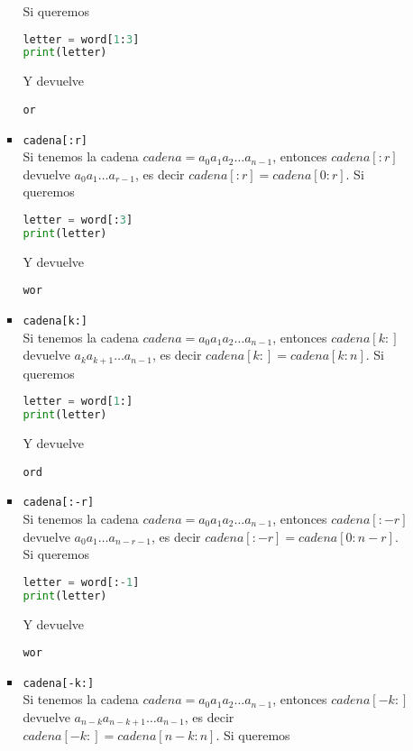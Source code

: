 \begin{enumerate}
\begin{enumerate}
\begin{itemize}
		Si queremos 
		\begin{lstlisting}[language={python}]
letter = word[1:3]
print(letter)
		\end{lstlisting}
		Y devuelve
		\begin{lstlisting}[language={[latex]tex}]
or
		\end{lstlisting}
		\item \texttt{cadena[:r]}\\
		Si tenemos la cadena $ cadena = a_{0}a_{1}a_{2}\ldots a_{n-1} $, entonces $ cadena[:r] $ devuelve $ a_{0}a_{1}\ldots a_{r-1} $, es decir $ cadena[:r] = cadena[0:r] $. 
		Si queremos 
		\begin{lstlisting}[language={python}]
letter = word[:3]
print(letter)
		\end{lstlisting}
		Y devuelve
		\begin{lstlisting}[language={[latex]tex}]
wor
		\end{lstlisting}
		\item \texttt{cadena[k:]}\\
		Si tenemos la cadena $ cadena = a_{0}a_{1}a_{2}\ldots a_{n-1} $, entonces $ cadena[k:] $ devuelve $ a_{k}a_{k+1}\ldots a_{n-1} $, es decir $ cadena[k:] = cadena[k:n] $. 
		Si queremos 
		\begin{lstlisting}[language={python}]
letter = word[1:]
print(letter)
		\end{lstlisting}
		Y devuelve
		\begin{lstlisting}[language={[latex]tex}]
ord
		\end{lstlisting}
		\item \texttt{cadena[:-r]}\\
		Si tenemos la cadena $ cadena = a_{0}a_{1}a_{2}\ldots a_{n-1} $, entonces $ cadena[:-r] $ devuelve $ a_{0}a_{1}\ldots a_{n-r-1} $, es decir $ cadena[:-r] = cadena[0:n-r] $. 
		Si queremos 
		\begin{lstlisting}[language={python}]
letter = word[:-1]
print(letter)
		\end{lstlisting}
		Y devuelve
		\begin{lstlisting}[language={[latex]tex}]
wor
		\end{lstlisting}
		\item \texttt{cadena[-k:]}\\
		Si tenemos la cadena $ cadena = a_{0}a_{1}a_{2}\ldots a_{n-1} $, entonces $ cadena[-k:] $ devuelve $ a_{n-k}a_{n-k+1}\ldots a_{n-1} $, es decir $ cadena[-k:] = cadena[n-k:n] $. 
		Si queremos 
		\begin{lstlisting}[language={python}]

\end{lstlisting}
\end{itemize}
\end{enumerate}
\end{enumerate}
